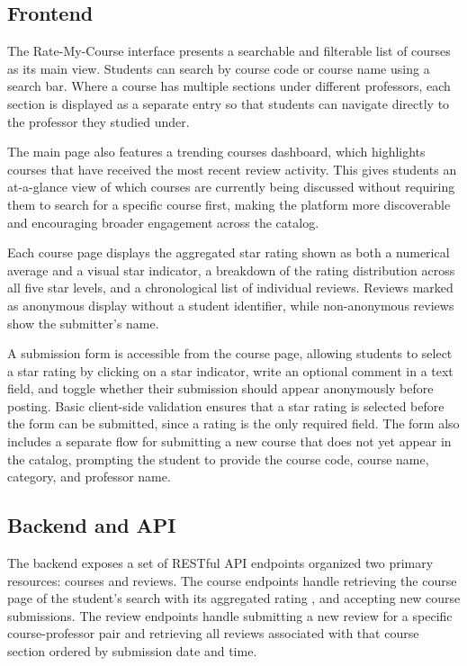 \subsection{Frontend}
The Rate-My-Course interface presents a searchable and filterable list of courses as its main view. Students can search by course code or course name using a search bar. Where a course has multiple sections under different professors, each section is displayed as a separate entry so that students can navigate directly to the professor they studied under.

The main page also features a trending courses dashboard, which highlights courses that have received the most recent review activity. This gives students an at-a-glance view of which courses are currently being discussed without requiring them to search for a specific course first, making the platform more discoverable and encouraging broader engagement across the catalog.

Each course page displays the aggregated star rating shown as both a numerical average and a visual star indicator, a breakdown of the rating distribution across all five star levels, and a chronological list of individual reviews. Reviews marked as anonymous display without a student identifier, while non-anonymous reviews show the submitter's name.

A submission form is accessible from the course page, allowing students to select a star rating by clicking on a star indicator, write an optional comment in a text field, and toggle whether their submission should appear anonymously before posting. Basic client-side validation ensures that a star rating is selected before the form can be submitted, since a rating is the only required field. The form also includes a separate flow for submitting a new course that does not yet appear in the catalog, prompting the student to provide the course code, course name, category, and professor name.

\subsection{Backend and API}
The backend exposes a set of RESTful API endpoints organized two primary resources: courses and reviews. The course endpoints handle retrieving the course page of the student’s search with its aggregated rating , and accepting new course submissions. The review endpoints handle submitting a new review for a specific course-professor pair and retrieving all reviews associated with that course section ordered by submission date and time.


